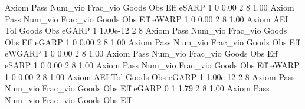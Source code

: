 {\smallskip}
{\smallskip}
{\smallskip}
       Axiom {\VBAR} Pass     Num_vio    Frac_vio       Goods         Obs         Eff  
       eSARP {\VBAR}    1           0        0.00           2           8        1.00  
{\smallskip}
{\smallskip}
{\smallskip}
       Axiom {\VBAR} Pass     Num_vio    Frac_vio       Goods         Obs         Eff  
       eWARP {\VBAR}    1           0        0.00           2           8        1.00  
{\smallskip}
       Axiom {\VBAR}       AEI        Tol      Goods        Obs 
       eGARP {\VBAR}         1   1.00e-12          2          8 
{\smallskip}
{\smallskip}
{\smallskip}
       Axiom {\VBAR} Pass     Num_vio    Frac_vio       Goods         Obs         Eff  
       eGARP {\VBAR}    1           0        0.00           2           8        1.00  
{\smallskip}
{\smallskip}
{\smallskip}
       Axiom {\VBAR} Pass     Num_vio    Frac_vio       Goods         Obs         Eff  
      eWGARP {\VBAR}    1           0        0.00           2           8        1.00  
{\smallskip}
{\smallskip}
{\smallskip}
       Axiom {\VBAR} Pass     Num_vio    Frac_vio       Goods         Obs         Eff  
       eSARP {\VBAR}    1           0        0.00           2           8        1.00  
{\smallskip}
{\smallskip}
{\smallskip}
       Axiom {\VBAR} Pass     Num_vio    Frac_vio       Goods         Obs         Eff  
       eWARP {\VBAR}    1           0        0.00           2           8        1.00  
{\smallskip}
       Axiom {\VBAR}       AEI        Tol      Goods        Obs 
       eGARP {\VBAR}         1   1.00e-12          2          8 
{\smallskip}
{\smallskip}
{\smallskip}
       Axiom {\VBAR} Pass     Num_vio    Frac_vio       Goods         Obs         Eff  
       eGARP {\VBAR}    0           1        1.79           2           8        1.00  
{\smallskip}
{\smallskip}
{\smallskip}
       Axiom {\VBAR} Pass     Num_vio    Frac_vio       Goods         Obs         Eff  
